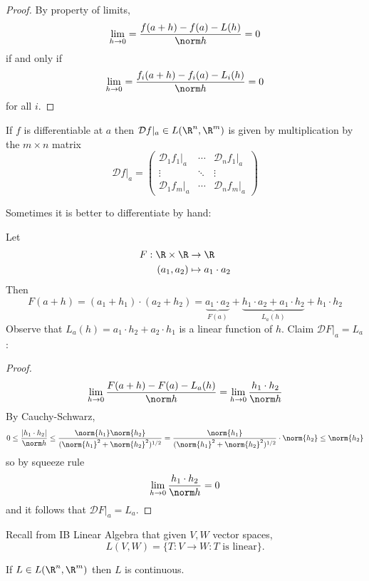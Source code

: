 \documentclass[a4paper]{article}
\newcommand*{\D}{\mathcal{D}}
\theoremstyle{definition}
\begin{document}
\begin{proof}
  By property of limits,
  \[
    \lim_{h \to 0} = \frac{f(a + h) - f(a) - L(h)}{\norm h} = 0
  \]
  if and only if
  \[
    \lim_{h \to 0} = \frac{f_i(a + h) - f_i(a) - L_i(h)}{\norm h} = 0
  \]
  for all \(i\).
\end{proof}

\begin{corollary}
  If \(f\) is differentiable at \(a\) then \(\D f|_a \in L(\R^n, \R^m)\) is given by multiplication by the \(m \times n\) matrix
\[
  \D f|_a =
  \begin{pmatrix}
    \D_1f_1|_a & \cdots & \D_nf_1|_a \\
    \vdots & \ddots & \vdots \\
    \D_1f_m|_a & \cdots & \D_nf_m|_a
  \end{pmatrix}
\]
\end{corollary}

Sometimes it is better to differentiate by hand:
\begin{eg}
  Let
  \begin{align*}
    F: \R \times \R &\to \R \\
    (a_1, a_2) &\mapsto a_1 \cdot a_2
  \end{align*}
  Then
  \[
    F(a + h) = (a_1 + h_1) \cdot (a_2 + h_2) = \underbrace{a_1 \cdot a_2}_{F(a)}
    + \underbrace{h_1 \cdot a_2 + a_1 \cdot h_2}_{L_a(h)}
    + h_1 \cdot h_2
  \]
  Observe that \(L_a(h) = a_1 \cdot h_2 + a_2 \cdot h_1\) is a linear function of \(h\). Claim \(\D F|_a = L_a\):
  \begin{proof}
    \[
      \lim_{h \to 0} \frac{F(a + h) - F(a) - L_a(h)}{\norm h} = \lim_{h \to 0} \frac{h_1 \cdot h_2}{\norm h}
    \]
    By Cauchy-Schwarz,
    \[
      0 \leq \frac{|h_1 \cdot h_2|}{\norm h} \leq \frac{\norm{h_1}\norm{h_2}}{(\norm{h_1}^2 + \norm{h_2}^2)^{1/2}} = \frac{\norm{h_1}}{(\norm{h_1}^2 + \norm{h_2}^2)^{1/2}} \cdot \norm{h_2} \leq \norm{h_2}
    \]
    so by squeeze rule
    \[
      \lim_{h \to 0} \frac{h_1 \cdot h_2}{\norm h} = 0
    \]
    and it follows that \(\D F|_a = L_a\).
  \end{proof}
\end{eg}

Recall from IB Linear Algebra that given \(V, W\) vector spaces,
\[
  L(V, W) = \{T:V \to W: T \text{ is linear}\}.
\]

\begin{lemma}
  If \(L \in L(\R^n, \R^m)\) then \(L\) is continuous.
\end{lemma}
\end{document}
